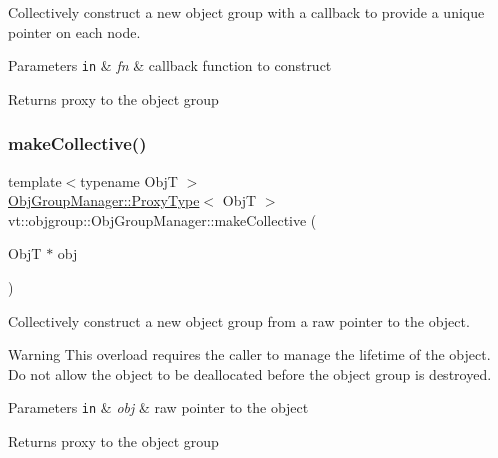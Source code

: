 Collectively construct a new object group with a callback to provide a unique pointer on each node. 


\begin{DoxyParams}[1]{Parameters}
\mbox{\tt in}  & {\em fn} & callback function to construct\\
\hline
\end{DoxyParams}
\begin{DoxyReturn}{Returns}
proxy to the object group 
\end{DoxyReturn}
\mbox{\label{structvt_1_1objgroup_1_1_obj_group_manager_a08fdc6029708edf1e3f7a4a66c998b99}} 
\subsubsection{\texorpdfstring{make\+Collective()}{makeCollective()}\hspace{0.1cm}{\footnotesize\ttfamily [4/5]}}
{\footnotesize\ttfamily template$<$typename ObjT $>$ \\
\hyperlink{structvt_1_1objgroup_1_1_obj_group_manager_aea65eef52f240a52210132eef5ce591f}{Obj\+Group\+Manager\+::\+Proxy\+Type}$<$ ObjT $>$ vt\+::objgroup\+::\+Obj\+Group\+Manager\+::make\+Collective (\begin{DoxyParamCaption}\item[{ObjT $\ast$}]{obj }\end{DoxyParamCaption})}



Collectively construct a new object group from a raw pointer to the object. 

\begin{DoxyWarning}{Warning}
This overload requires the caller to manage the lifetime of the object. Do not allow the object to be deallocated before the object group is destroyed.
\end{DoxyWarning}

\begin{DoxyParams}[1]{Parameters}
\mbox{\tt in}  & {\em obj} & raw pointer to the object\\
\hline
\end{DoxyParams}
\begin{DoxyReturn}{Returns}
proxy to the object group 
\end{DoxyReturn}
\mbox{\label{structvt_1_1objgroup_1_1_obj_group_manager_affb52495aa20a14b485ad3ba48234718}} 
